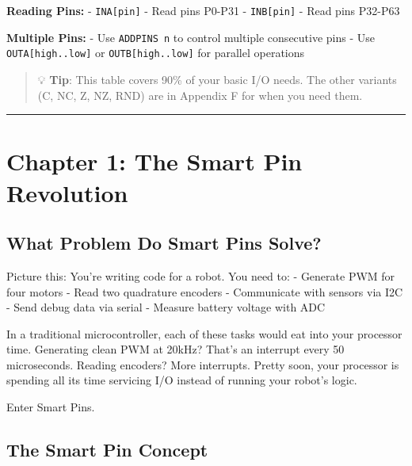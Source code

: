 \documentclass[11pt,a4paper,oneside,english]{book}
\begin{document}
\textbf{Reading Pins:} - \passthrough{\lstinline!INA[pin]!} - Read pins
P0-P31 - \passthrough{\lstinline!INB[pin]!} - Read pins P32-P63

\textbf{Multiple Pins:} - Use \passthrough{\lstinline!ADDPINS n!} to
control multiple consecutive pins - Use
\passthrough{\lstinline!OUTA[high..low]!} or
\passthrough{\lstinline!OUTB[high..low]!} for parallel operations

\begin{quote}
💡 \textbf{Tip}: This table covers 90\% of your basic I/O needs. The
other variants (C, NC, Z, NZ, RND) are in Appendix F for when you need
them.
\end{quote}

\begin{center}\rule{0.5\linewidth}{0.5pt}\end{center}

\clearpage

\clearpage

\hypertarget{chapter-1-the-smart-pin-revolution}{%
\chapter{Chapter 1: The Smart Pin
Revolution}\label{chapter-1-the-smart-pin-revolution}}

\hypertarget{what-problem-do-smart-pins-solve}{%
\section{What Problem Do Smart Pins
Solve?}\label{what-problem-do-smart-pins-solve}}

Picture this: You're writing code for a robot. You need to: - Generate
PWM for four motors - Read two quadrature encoders - Communicate with
sensors via I2C - Send debug data via serial - Measure battery voltage
with ADC

In a traditional microcontroller, each of these tasks would eat into
your processor time. Generating clean PWM at 20kHz? That's an interrupt
every 50 microseconds. Reading encoders? More interrupts. Pretty soon,
your processor is spending all its time servicing I/O instead of running
your robot's logic.

Enter Smart Pins.

\hypertarget{the-smart-pin-concept}{%
\section{The Smart Pin Concept}\label{the-smart-pin-concept}}
\end{document}
